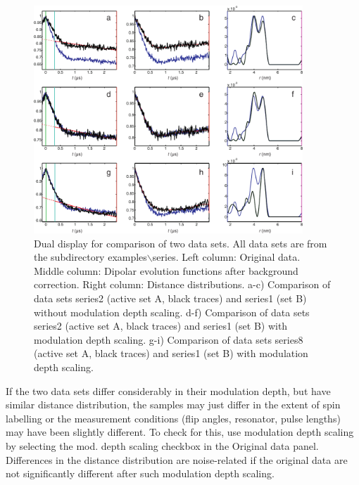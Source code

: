 \documentclass{article}
\begin{document}
\begin{figure}[ht]
 	\begin{center}
  \includegraphics[width=0.9\textwidth]{fig9.pdf}
	\end{center}
	\caption{Dual display for comparison of two data sets. All data sets are from the subdirectory {\ttfamily examples$\backslash$series}. Left column: Original data. Middle column: Dipolar evolution functions after background correction. Right column: Distance distributions. a-c) Comparison of data sets {\ttfamily series2} (active set A, black traces) and {\ttfamily series1} (set B) without modulation depth scaling. d-f) Comparison of data sets {\ttfamily series2} (active set A, black traces) and {\ttfamily series1} (set B) with modulation depth scaling. g-i) Comparison of data sets {\ttfamily series8} (active set A, black traces) and {\ttfamily series1} (set B) with modulation depth scaling. }
	\label{fig:manfig9}
\end{figure}

If the two data sets differ considerably in their modulation depth, but have similar distance distribution, the samples may just differ in the extent of spin labelling or the measurement conditions (flip angles, resonator, pulse lengths) may have been slightly different. To check for this, use modulation depth scaling \cite{jeschke2004a} by selecting the {\ttfamily mod. depth scaling} checkbox in the {\ttfamily Original data} panel. Differences in the distance distribution are noise-related if the original data are not significantly different after such modulation depth scaling.
\end{document}
